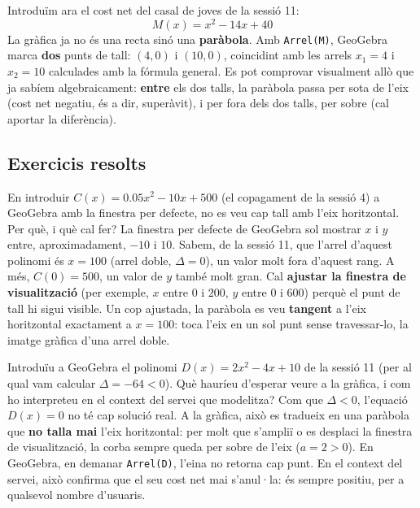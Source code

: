 \begin{exemple}
Introduïm ara el cost net del casal de joves de la sessió 11:
\[
M(x) = x^2 - 14x + 40
\]
La gràfica ja no és una recta sinó una \textbf{paràbola}. Amb
\texttt{Arrel(M)}, GeoGebra marca \textbf{dos} punts de tall:
$(4, 0)$ i $(10, 0)$, coincidint amb les arrels $x_1=4$ i $x_2=10$
calculades amb la fórmula general. Es pot comprovar visualment allò que
ja sabíem algebraicament: \textbf{entre} els dos talls, la paràbola passa
per sota de l'eix (cost net negatiu, és a dir, superàvit), i per fora
dels dos talls, per sobre (cal aportar la diferència).
\end{exemple}

\subsection{Exercicis resolts}

\begin{exresolt}
En introduir $C(x)=\num{0,05}x^2-10x+500$ (el copagament de la sessió 4)
a GeoGebra amb la finestra per defecte, no es veu cap tall amb l'eix
horitzontal. Per què, i què cal fer?
\solucio
La finestra per defecte de GeoGebra sol mostrar $x$ i $y$ entre,
aproximadament, $-10$ i $10$. Sabem, de la sessió 11, que l'arrel
d'aquest polinomi és $x=100$ (arrel doble, $\Delta=0$), un valor molt
fora d'aquest rang. A més, $C(0)=500$, un valor de $y$ també molt gran.
Cal \textbf{ajustar la finestra de visualització} (per exemple, $x$ entre
$0$ i $200$, $y$ entre $0$ i $600$) perquè el punt de tall hi sigui
visible. Un cop ajustada, la paràbola es veu \textbf{tangent} a l'eix
horitzontal exactament a $x=100$: toca l'eix en un sol punt sense
travessar-lo, la imatge gràfica d'una arrel doble.
\end{exresolt}

\begin{exresolt}
Introduïu a GeoGebra el polinomi $D(x)=2x^2-4x+10$ de la sessió 11
(per al qual vam calcular $\Delta=-64<0$). Què hauríeu d'esperar veure
a la gràfica, i com ho interpreteu en el context del servei que
modelitza?
\solucio
Com que $\Delta<0$, l'equació $D(x)=0$ no té cap solució real. A la
gràfica, això es tradueix en una paràbola que \textbf{no talla mai}
l'eix horitzontal: per molt que s'ampliï o es desplaci la finestra de
visualització, la corba sempre queda per sobre de l'eix ($a=2>0$).
En GeoGebra, en demanar \texttt{Arrel(D)}, l'eina no retorna cap punt.
En el context del servei, això confirma que el seu cost net mai
s'anul·la: és sempre positiu, per a qualsevol nombre d'usuaris.
\end{exresolt}

